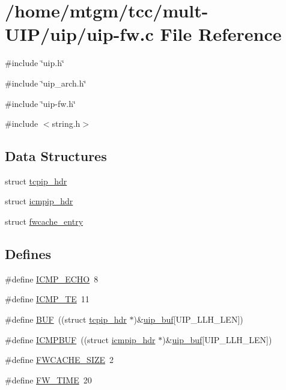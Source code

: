 \hypertarget{uip-fw_8c}{
\section{/home/mtgm/tcc/mult-\/UIP/uip/uip-\/fw.c File Reference}
\label{uip-fw_8c}
}
{\ttfamily \#include \char`\"{}uip.h\char`\"{}}\par
{\ttfamily \#include \char`\"{}uip\_\-arch.h\char`\"{}}\par
{\ttfamily \#include \char`\"{}uip-\/fw.h\char`\"{}}\par
{\ttfamily \#include $<$string.h$>$}\par
\subsection*{Data Structures}
\begin{DoxyCompactItemize}
\item 
struct \hyperlink{structtcpip__hdr}{tcpip\_\-hdr}
\item 
struct \hyperlink{structicmpip__hdr}{icmpip\_\-hdr}
\item 
struct \hyperlink{structfwcache__entry}{fwcache\_\-entry}
\end{DoxyCompactItemize}
\subsection*{Defines}
\begin{DoxyCompactItemize}
\item 
\#define \hyperlink{group__uipfw_gad58231410d58e34b455328b888a9e73c}{ICMP\_\-ECHO}~8
\item 
\#define \hyperlink{group__uipfw_ga58e03a47804158d97a9c069cc2204797}{ICMP\_\-TE}~11
\item 
\#define \hyperlink{group__uipfw_ga24f52ac52d6e714cb04a5aa01be3bdd0}{BUF}~((struct \hyperlink{structtcpip__hdr}{tcpip\_\-hdr} $\ast$)\&\hyperlink{group__uipdevfunc_gab81e78f890dbbee50c533a9734b74fd9}{uip\_\-buf}\mbox{[}UIP\_\-LLH\_\-LEN\mbox{]})
\item 
\#define \hyperlink{group__uipfw_ga4309376690872fa4beb4f025f5cc199b}{ICMPBUF}~((struct \hyperlink{structicmpip__hdr}{icmpip\_\-hdr} $\ast$)\&\hyperlink{group__uipdevfunc_gab81e78f890dbbee50c533a9734b74fd9}{uip\_\-buf}\mbox{[}UIP\_\-LLH\_\-LEN\mbox{]})
\item 
\#define \hyperlink{group__uipfw_ga628391fb3eeb786fe6246dc4fc0c3554}{FWCACHE\_\-SIZE}~2
\item 
\#define \hyperlink{group__uipfw_ga37a94c7dd987d85126d49aba7ed5ffe7}{FW\_\-TIME}~20
\end{DoxyCompactItemize}
